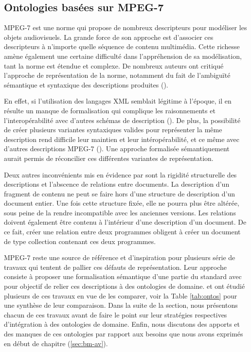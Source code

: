 






\subsection{Ontologies basées sur MPEG-7}
MPEG-7 est une norme qui propose de nombreux descripteurs pour modéliser les objets audiovisuels.
La grande force de son approche est d'associer ces descripteurs à n'importe quelle séquence de contenu multimédia.
Cette richesse amène également une certaine difficulté dans l'appréhension de sa modélisation, tant la norme est étendue et complexe. 
De nombreux auteurs ont critiqué l'approche de représentation de la norme, notamment du fait de l'ambiguïté sémantique et syntaxique des descriptions produites (\cite{VanOssenbruggen2004, Nack2005a, Troncy2007, Dasiopoulou2009, Arndt2007}).

En effet, si l'utilisation des langages XML semblait légitime à l'époque, il en résulte un manque de formalisation qui complique les raisonnements et l'interopérabilité avec d'autres schémas de description (\cite{Nack2005a}).
De plus, la possibilité de créer plusieurs variantes syntaxiques valides pour représenter la même description rend difficile leur maintien et leur intéropérabilité, et ce même avec d'autres descriptions MPEG-7 (\cite{Arndt2007}).
Une approche formalisée sémantiquement aurait permis de réconcilier ces différentes variantes de représentation. 

Deux autres inconvénients mis en évidence par \cite{Nack2005a} sont la rigidité structurelle des descriptions et l'abscence de relations entre documents. 
La description d'un fragment de contenu ne peut se faire hors d'une structure de description d'un document entier. 
Une fois cette structure fixée, elle ne pourra plus être altérée, sous peine de la rendre incompatible avec les anciennes versions.
Les relations doivent également être contenu à l'intérieur d'une description d'un document.
De ce fait, créer une relation entre deux programmes obligent à créer un document de type collection contenant ces deux programmes.

MPEG-7 reste une source de référence et d'inspiration pour plusieurs série de travaux qui tentent de pallier ces défauts de représentation.
Leur approche consiste à proposer une formalisation sémantique d'une partie du standard avec pour objectif de relier ces descriptions à des ontologies de domaine.
\cite{Troncy2007} et \cite{Dasiopoulou2009} ont étudié plusieurs de ces travaux en vue de les comparer, voir la Table \ref{tab:ontos} pour une synthèse de leur comparaison. 
Dans la suite de la section, nous présentons chacun de ces travaux avant de faire le point sur leur stratégies respectives d'intégration à des ontologies de domaine.
Enfin, nous discutons des apports et des manques de ces ontologies par rapport aux besoins que nous avons exprimés en début de chapitre (\ref{sec:bm-av}).

